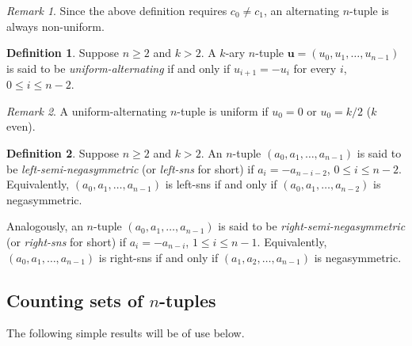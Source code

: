 \documentclass[a4paper,11pt]{article}
\theoremstyle{plain}
\theoremstyle{definition}
\newtheorem{definition}{Definition}[section]
\theoremstyle{remark}
\newtheorem{remark}{Remark}[section]
\begin{document}
\begin{remark}
Since the above definition requires $c_0\neq c_1$, an alternating $n$-tuple is always non-uniform.
\end{remark}

\begin{definition}
Suppose $n\geq2$ and $k>2$.  A $k$-ary $n$-tuple $\mathbf{u}=(u_0,u_1,\ldots,u_{n-1})$ is said
to be \emph{uniform-alternating} if and only if $u_{i+1}=-u_i$ for every $i$, $0\leq i\leq
n-2$.
\end{definition}

\begin{remark}
A uniform-alternating $n$-tuple is uniform if $u_0=0$ or $u_0=k/2$ ($k$ even).
\end{remark}

\begin{definition}
Suppose $n\geq2$ and $k>2$.  An $n$-tuple $(a_0,a_1,\ldots,a_{n-1})$ is said to be
\emph{left-semi-negasymmetric} (or \emph{left-sns} for short) if $a_i=-a_{n-i-2}$, $0\leq i\leq
n-2$. Equivalently, $(a_0,a_1,\ldots,a_{n-1})$ is left-sns if and only if
$(a_0,a_1,\ldots,a_{n-2})$ is negasymmetric.

Analogously, an $n$-tuple $(a_0,a_1,\ldots,a_{n-1})$ is said to be \emph{right-semi-negasymmetric}
(or \emph{right-sns} for short) if $a_i=-a_{n-i}$, $1\leq i\leq n-1$.  Equivalently,
$(a_0,a_1,\ldots,a_{n-1})$ is right-sns if and only if $(a_1,a_2,\ldots,a_{n-1})$ is negasymmetric.
\end{definition}

\subsection{Counting sets of $n$-tuples}

The following simple results will be of use below.
\end{document}
